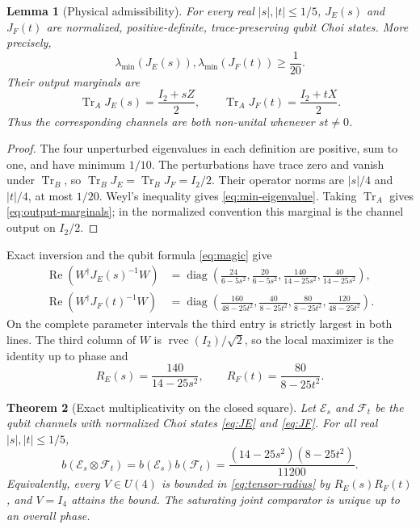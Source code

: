 \documentclass[11pt,a4paper]{article}
\newtheorem{theorem}{Theorem}
\newtheorem{lemma}[theorem]{Lemma}
\theoremstyle{remark}
\DeclareMathOperator{\Tr}{Tr}
\DeclareMathOperator{\rvec}{rvec}
\DeclareMathOperator{\Ree}{Re}
\newcommand{\cE}{\mathcal E}
\newcommand{\cF}{\mathcal F}
\newcommand{\I}{I}
\begin{document}
\begin{lemma}[Physical admissibility]
\label{lem:admissible}
For every real $|s|,|t|\leq1/5$, $J_E(s)$ and $J_F(t)$ are normalized,
positive-definite, trace-preserving qubit Choi states.  More precisely,
\begin{equation}
 \lambda_{\min}(J_E(s)),\lambda_{\min}(J_F(t))\geq\frac1{20}.
 \label{eq:min-eigenvalue}
\end{equation}
Their output marginals are
\begin{equation}
 \Tr_AJ_E(s)=\frac{\I_2+sZ}{2},\qquad
 \Tr_AJ_F(t)=\frac{\I_2+tX}{2}.
 \label{eq:output-marginals}
\end{equation}
Thus the corresponding channels are both non-unital whenever $st\neq0$.
\end{lemma}

\begin{proof}
The four unperturbed eigenvalues in each definition are positive, sum to one,
and have minimum $1/10$.  The perturbations have trace zero and vanish under
$\Tr_B$, so $\Tr_BJ_E=\Tr_BJ_F=\I_2/2$.  Their operator norms are
$|s|/4$ and $|t|/4$, at most $1/20$.  Weyl's inequality gives
\eqref{eq:min-eigenvalue}.  Taking $\Tr_A$ gives
\eqref{eq:output-marginals}; in the normalized convention this marginal is
the channel output on $\I_2/2$.
\end{proof}

Exact inversion and the qubit formula \eqref{eq:magic} give
\begin{align}
 \Ree(W^\dagger J_E(s)^{-1}W)
 &=\operatorname{diag}\!\left(
 \frac{24}{6-5s^2},\frac{20}{6-5s^2},
 \frac{140}{14-25s^2},\frac{40}{14-25s^2}\right),
 \label{eq:magic-E}\\
 \Ree(W^\dagger J_F(t)^{-1}W)
 &=\operatorname{diag}\!\left(
 \frac{160}{48-25t^2},\frac{40}{8-25t^2},
 \frac{80}{8-25t^2},\frac{120}{48-25t^2}\right).
 \label{eq:magic-F}
\end{align}
On the complete parameter intervals the third entry is strictly largest in
both lines.  The third column of $W$ is $\rvec(\I_2)/\sqrt2$, so the local
maximizer is the identity up to phase and
\begin{equation}
 R_E(s)=\frac{140}{14-25s^2},\qquad
 R_F(t)=\frac{80}{8-25t^2}.
 \label{eq:local-radii}
\end{equation}

\begin{theorem}[Exact multiplicativity on the closed square]
\label{thm:main}
Let $\cE_s$ and $\cF_t$ be the qubit channels with normalized Choi states
\eqref{eq:JE} and \eqref{eq:JF}.  For all real
$|s|,|t|\leq1/5$,
\begin{equation}
 b(\cE_s\otimes\cF_t)=b(\cE_s)b(\cF_t)
 =\frac{(14-25s^2)(8-25t^2)}{11200}.
 \label{eq:main-result}
\end{equation}
Equivalently, every $V\in U(4)$ is bounded in
\eqref{eq:tensor-radius} by $R_E(s)R_F(t)$, and $V=\I_4$ attains the bound.
The saturating joint comparator is unique up to an overall phase.
\end{theorem}
\end{document}
